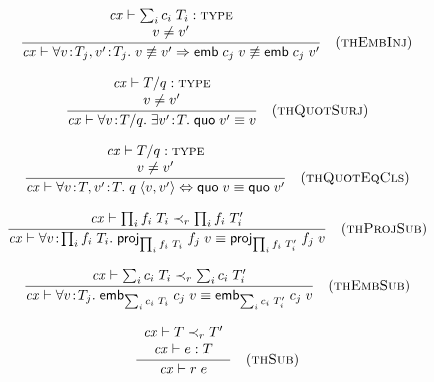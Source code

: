 \[
\frac{\begin{array}{c}\mathit{cx}\vdash\sum_{i}c_i\;T_i:\textsc{type}\\v\neq v'\end{array}}{\mathit{cx}\vdash\forall v\!:\!T_j,v'\!:\!T_j.\;v\not\equiv v'\Rightarrow\mathsf{emb}\;{c_j}\;v\not\equiv\mathsf{emb}\;{c_j}\;v'}\quad\mbox{(\textsc{thEmbInj})}
\]

\[
\frac{\begin{array}{c}\mathit{cx}\vdash T/q:\textsc{type}\\v\neq v'\end{array}}{\mathit{cx}\vdash\forall v\!:\!T/q.\;\exists v'\!:\!T.\;\mathsf{quo}\;v'\equiv v}\quad\mbox{(\textsc{thQuotSurj})}
\]

\[
\frac{\begin{array}{c}\mathit{cx}\vdash T/q:\textsc{type}\\v\neq v'\end{array}}{\mathit{cx}\vdash\forall v\!:\!T,v'\!:\!T.\;q\;\langle v,v'\rangle\Leftrightarrow\mathsf{quo}\;v\equiv\mathsf{quo}\;v'}\quad\mbox{(\textsc{thQuotEqCls})}
\]

\[
\frac{\begin{array}{c}\mathit{cx}\vdash\prod_{i}f_i\;T_i\prec_{r}\prod_{i}f_i\;T_i'\end{array}}{\mathit{cx}\vdash\forall v\!:\!\prod_{i}f_i\;T_i.\;\mathsf{proj}_{\prod_{i}f_i\;T_i}\;{f_j}\;v\equiv\mathsf{proj}_{\prod_{i}f_i\;T_i'}\;{f_j}\;v}\quad\mbox{(\textsc{thProjSub})}
\]

\[
\frac{\begin{array}{c}\mathit{cx}\vdash\sum_{i}c_i\;T_i\prec_{r}\sum_{i}c_i\;T_i'\end{array}}{\mathit{cx}\vdash\forall v\!:\!T_j.\;\mathsf{emb}_{\sum_{i}c_i\;T_i}\;{c_j}\;v\equiv\mathsf{emb}_{\sum_{i}c_i\;T_i'}\;{c_j}\;v}\quad\mbox{(\textsc{thEmbSub})}
\]

\[
\frac{\begin{array}{c}\mathit{cx}\vdash T\prec_{r}T'\\\mathit{cx}\vdash e:T\end{array}}{\mathit{cx}\vdash r\;e}\quad\mbox{(\textsc{thSub})}
\]

